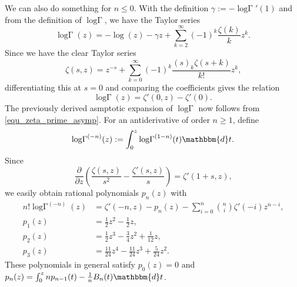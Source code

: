 \documentclass[12pt]{article}
\newcommand{\dd}[0] {\mathbbm{d}}
\newcommand{\logG} {\operatorname {log \Gamma}}
\numberwithin{equation}{section}
\begin{document}
We can also do something for $n \le 0$. With the definition $\gamma := - \logG'(1)$ and from the definition of $\logG$, we have the Taylor series 
\begin{equation*}
\logG (z) = -\log(z) - \gamma z + \sum_{k=2}^{\infty} (-1)^k \frac{\zeta(k)}{k} z^k\text{.}
\end{equation*}
Since we have the clear Taylor series
\begin{equation*}
\zeta(s,z) = z^{-s} + \sum_{k=0}^{\infty} (-1)^k \frac{(s)_k \zeta(s+k)}{k!} z^k\text{,} 
\end{equation*}
differentiating this at $s=0$ and comparing the coefficients gives the relation
\begin{equation*}
\logG(z) = \zeta'(0,z) - \zeta'(0)\text{.}
\end{equation*}
The previously derived asmptotic expansion of $\logG$ now follows from \eqref{equ_zeta_prime_asymp}. For an antiderivative of order $n \ge 1$, define
\begin{equation*}
\logG^{(-n)}(z) := \int_0^z \logG^{(1-n)}(t) \dd t\text{.}
\end{equation*}
Since
\begin{equation*}
\frac{\partial}{\partial z} \left( \frac{\zeta(s,z)}{s^2} - \frac{\zeta'(s,z)}{s}\right) = \zeta'(1+s,z)\text{,}
\end{equation*}
we easily obtain rational polynomials $p_n(z)$ with
\begin{align*}
n! \logG^{(-n)}(z) &= \zeta'(-n,z) - p_n(z) - \sum_{i=0}^{n} \binom{n}{i} \zeta'(-i) z^{n-i}\text{,}\\
p_1(z) &= \tfrac{1}{2} z^2 - \tfrac{1}{2} z\text{,}\\
p_2(z) &= \tfrac{1}{2} z^3 -\tfrac{3}{4} z^2 + \tfrac{1}{12} z \text{,}\\
p_3(z) &= \tfrac{11}{24} z^4 - \tfrac{11}{24} z^3 + \tfrac{5}{24} z^2\text{.}
\end{align*}
These polynomials in general satisfy $p_0(z) = 0$ and $
p_n(z) = \int_0^{z} n p_{n-1}(t) - \tfrac{1}{n} B_n(t) \dd t$.
\end{document}
